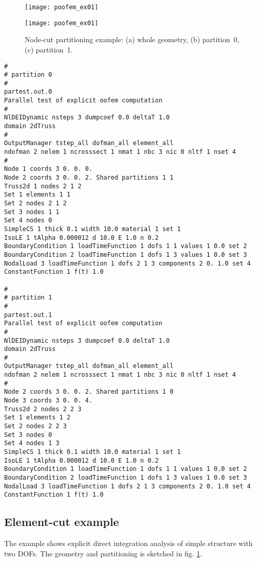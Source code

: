 \documentclass[a4paper]{report}
\begin{document}
\begin{figure}[htb]
\begin{htmlonly}
  \centerline{\texttt{[image: poofem\_ex01]}}
\end{htmlonly}
\centerline{\texttt{[image: poofem\_ex01]}}
\caption{Node-cut partitioning example: (a) whole geometry,
(b) partition~0, (c) partition~1.}
\label{nodecut-ex01}
\end{figure}

\begin{verbatim}
#
# partition 0
#
partest.out.0
Parallel test of explicit oofem computation
#
NlDEIDynamic nsteps 3 dumpcoef 0.0 deltaT 1.0
domain 2dTruss
#
OutputManager tstep_all dofman_all element_all
ndofman 2 nelem 1 ncrosssect 1 nmat 1 nbc 3 nic 0 nltf 1 nset 4
#
Node 1 coords 3 0. 0. 0.
Node 2 coords 3 0. 0. 2. Shared partitions 1 1
Truss2d 1 nodes 2 1 2
Set 1 elements 1 1
Set 2 nodes 2 1 2
Set 3 nodes 1 1
Set 4 nodes 0
SimpleCS 1 thick 0.1 width 10.0 material 1 set 1
IsoLE 1 tAlpha 0.000012 d 10.0 E 1.0 n 0.2
BoundaryCondition 1 loadTimeFunction 1 dofs 1 1 values 1 0.0 set 2
BoundaryCondition 2 loadTimeFunction 1 dofs 1 3 values 1 0.0 set 3
NodalLoad 3 loadTimeFunction 1 dofs 2 1 3 components 2 0. 1.0 set 4
ConstantFunction 1 f(t) 1.0

#
# partition 1
#
partest.out.1
Parallel test of explicit oofem computation
#
NlDEIDynamic nsteps 3 dumpcoef 0.0 deltaT 1.0
domain 2dTruss
#
OutputManager tstep_all dofman_all element_all
ndofman 2 nelem 1 ncrosssect 1 nmat 1 nbc 3 nic 0 nltf 1 nset 4
#
Node 2 coords 3 0. 0. 2. Shared partitions 1 0
Node 3 coords 3 0. 0. 4.
Truss2d 2 nodes 2 2 3
Set 1 elements 1 2
Set 2 nodes 2 2 3
Set 3 nodes 0
Set 4 nodes 1 3
SimpleCS 1 thick 0.1 width 10.0 material 1 set 1
IsoLE 1 tAlpha 0.000012 d 10.0 E 1.0 n 0.2
BoundaryCondition 1 loadTimeFunction 1 dofs 1 1 values 1 0.0 set 2
BoundaryCondition 2 loadTimeFunction 1 dofs 1 3 values 1 0.0 set 3
NodalLoad 3 loadTimeFunction 1 dofs 2 1 3 components 2 0. 1.0 set 4
ConstantFunction 1 f(t) 1.0
\end{verbatim}

\subsection{Element-cut example}
The example shows explicit direct integration analysis of
simple structure with two DOFs. The geometry and partitioning is sketched in
fig. \ref{nodecut-ex01}.
\end{document}
